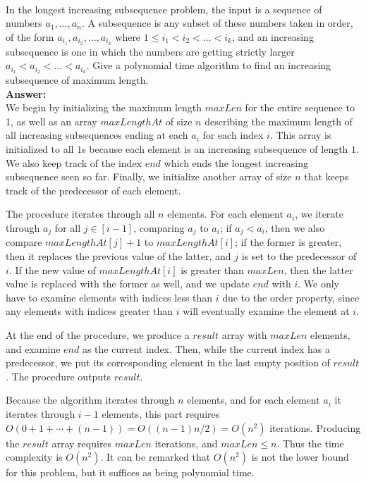 \documentclass[a4paper,11pt]{article}
\begin{document}
\bigskip
{}\\
In the longest increasing subsequence problem, the input is a sequence of numbers $a_1, \ldots , a_n$.
A subsequence is any subset of these numbers taken in order, of the form $a_{i_1} , a_{i_2} , \ldots , a_{i_k}$ where
$1 \leq i_1 < i_2 < \ldots < i_k$, and an increasing subsequence is one in which the numbers are getting strictly larger
 $a_{i_1} < a_{i_2} < \ldots < a_{i_k}$. 
Give a polynomial time algorithm to find an increasing subsequence of maximum length.\\
{\bf Answer:}\\
We begin by initializing the maximum length $maxLen$ for the entire sequence to 1, as well as an array $maxLengthAt$ of size $n$ describing the maximum length of all increasing subsequences ending at each $a_i$ for each index $i$. This array is initialized to all $1$s because each element is an increasing subsequence of length $1$. We also keep track of the index $end$ which ends the longest increasing subsequence seen so far. Finally, we initialize another array of size $n$ that keeps track of the predecessor of each element. \par
The procedure iterates through all $n$ elements. For each element $a_i$, we iterate through $a_j$ for all $j \in [i - 1]$, comparing $a_j$ to $a_i$; if $a_j < a_i$, then we also compare $maxLengthAt[j] + 1$ to $maxLengthAt[i]$; if the former is greater, then it replaces the previous value of the latter, and $j$ is set to the predecessor of $i$. If the new value of $maxLengthAt[i]$ is greater than $maxLen$, then the latter value is replaced with the former as well, and we update $end$ with $i$. We only have to examine elements with indices less than $i$ due to the order property, since any elements with indices greater than $i$ will eventually examine the element at $i$. \par
At the end of the procedure, we produce a $result$ array with $maxLen$ elements, and examine $end$ as the current index. Then, while the current index has a predecessor, we put its corresponding element in the last empty position of $result$. The procedure outputs $result$. \par
Because the algorithm iterates through $n$ elements, and for each element $a_i$ it iterates through $i - 1$ elements, this part requires $O(0 + 1 + \cdots + (n - 1)) = O((n - 1)n/2) = O(n^2)$ iterations. Producing the $result$ array requires $maxLen$ iterations, and $maxLen \leq n$. Thus the time complexity is $O(n^2)$. It can be remarked that $O(n^2)$ is not the lower bound for this problem, but it suffices as being polynomial time.
\end{document}
